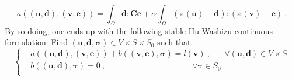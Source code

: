 \documentclass[preprint,12pt,authoryear]{elsarticle}
\begin{document}
\begin{equation}
a( (\bm{u},\bm{d}), (\bm{v}, \bm{e}) ) 
= \int_{\Omega} \bm{d} : \bm{C}\bm{e} 
+ \alpha \int_{\Omega} (\bm{\varepsilon}(\bm{u}) 
- \bm{d}):(\bm{\varepsilon}(\bm{v}) - \bm{e})\:.
\end{equation}
By so doing, one ends up with the following stable Hu-Washizu continuous formulation: 
Find $\left(\bm{u}, \bm{d},\bm{\sigma}\right)\in V\times S\times S_{0}$ such that:
\begin{equation} \label{eq:system_hw_modify}
\left\lbrace
\begin{split}
& a( (\bm{u},\bm{d}), (\bm{v}, \bm{e}) ) 
+ b( (\bm{v}, \bm{e}), \bm{\sigma} ) = l(\bm{v})\:, 
\hspace{20pt} \forall \left(\bm{u},\bm{d}\right)\in V \times S \\
& b( (\bm{u},\bm{d}), \bm{\tau} ) = 0\:, 
\hspace{127pt} \forall\bm{\tau}\in S_{0} \\
\end{split}
\right.
\end{equation}
\end{document}
